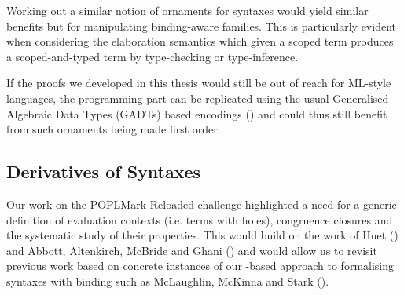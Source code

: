 Working out a similar notion of ornaments for syntaxes would yield similar
benefits but for manipulating binding-aware families. This is particularly
evident when considering the elaboration semantics which given a scoped term
produces a scoped-and-typed term by type-checking or type-inference.

If the proofs we developed in this thesis would still be out of reach for
ML-style languages, the programming part can be replicated using the usual
Generalised Algebraic Data Types (GADTs) based encodings
(\cite{danvytagless,lindley2014hasochism}) and could thus still benefit from
such ornaments being made first order.

\subsection{Derivatives of Syntaxes}

Our work on the POPLMark Reloaded challenge highlighted a need for a generic
definition of evaluation contexts (i.e. terms with holes), congruence closures
and the systematic study of their properties. This would build on the work of
Huet (\citeyear{huet_1997}) and Abbott, Altenkirch, McBride and Ghani
(\citeyear{abbott2005data}) and would allow us to revisit previous work
based on concrete instances of our -based approach to formalising
syntaxes with binding such as McLaughlin, McKinna and Stark (\citeyear{craig2018triangle}).
